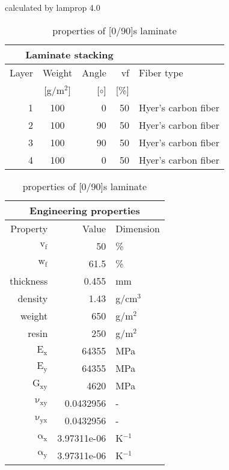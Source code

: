 \begin{table}[!htbp]
  \renewcommand{\arraystretch}{1.2}
  \caption{\label{tab:[0/90]s laminate}properties of [0/90]s laminate}
  \centering\footnotesize{\rule{0pt}{10pt}
  \tiny calculated by lamprop 4.0\\[3pt]}
    \begin{tabular}[t]{rcrrl}
      \multicolumn{4}{c}{\small\textbf{Laminate stacking}}\\[0.1em]
      \toprule %
      Layer & Weight & Angle & vf & Fiber type\\
            & [g/m$^2$] & [$\circ$] & [\%]\\
      \midrule
      1 &  100 &     0 & 50 & Hyer's carbon fiber\\
      2 &  100 &    90 & 50 & Hyer's carbon fiber\\
      3 &  100 &    90 & 50 & Hyer's carbon fiber\\
      4 &  100 &     0 & 50 & Hyer's carbon fiber\\
      \bottomrule
    \end{tabular}\hspace{0.02\textwidth}
    \begin{tabular}[t]{rrl}
      \multicolumn{3}{c}{\small\textbf{Engineering properties}}\\[0.1em]
      \toprule
      Property & Value & Dimension\\
      \midrule
      $\mathrm{v_f}$ & 50 &\%\\
      $\mathrm{w_f}$ & 61.5 &\%\\
      thickness & 0.455 & mm\\
      density & 1.43 & g/cm$^3$\\
      weight & 650 & g/m$^2$\\
      resin & 250 & g/m$^2$\\
      \midrule
      $\mathrm{E_x}$ &    64355 & MPa\\
      $\mathrm{E_y}$ &    64355 & MPa\\
      $\mathrm{G_{xy}}$ &     4620 & MPa\\
      $\mathrm{\nu_{xy}}$ & 0.0432956 &-\\
      $\mathrm{\nu_{yx}}$ & 0.0432956 &-\\
      $\mathrm{\alpha_x}$ & 3.97311e-06 & K$^{-1}$\\
      $\mathrm{\alpha_y}$ & 3.97311e-06 & K$^{-1}$\\
      \bottomrule
    \end{tabular}

\end{table}
